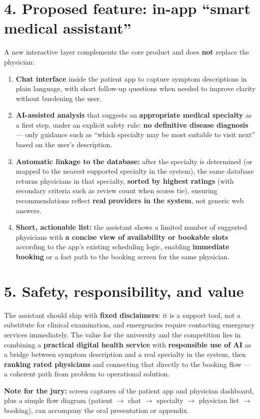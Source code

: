 \documentclass[12pt,a4paper]{article}
\begin{document}
\section*{4. Proposed feature: in-app ``smart medical assistant''}
A new interactive layer complements the core product and does \textbf{not} replace the physician:

\begin{enumerate}
  \item \textbf{Chat interface} inside the patient app to capture symptom descriptions in plain language, with short follow-up questions when needed to improve clarity without burdening the user.
  \item \textbf{AI-assisted analysis} that suggests an \textbf{appropriate medical specialty} as a first step, under an explicit safety rule: \textbf{no definitive disease diagnosis} --- only guidance such as ``which specialty may be most suitable to visit next'' based on the user's description.
  \item \textbf{Automatic linkage to the database:} after the specialty is determined (or mapped to the nearest supported specialty in the system), the same database returns physicians in that specialty, \textbf{sorted by highest ratings} (with secondary criteria such as review count when scores tie), ensuring recommendations reflect \textbf{real providers in the system}, not generic web answers.
  \item \textbf{Short, actionable list:} the assistant shows a limited number of suggested physicians with \textbf{a concise view of availability or bookable slots} according to the app's existing scheduling logic, enabling \textbf{immediate booking} or a fast path to the booking screen for the same physician.
\end{enumerate}

\section*{5. Safety, responsibility, and value}
The assistant should ship with \textbf{fixed disclaimers}: it is a support tool, not a substitute for clinical examination, and emergencies require contacting emergency services immediately. The value for the university and the competition lies in combining a \textbf{practical digital health service} with \textbf{responsible use of AI} as a bridge between symptom description and a real specialty in the system, then \textbf{ranking rated physicians} and connecting that directly to the booking flow --- a coherent path from problem to operational solution.

\vfill
\begin{center}\small
\textbf{Note for the jury:} screen captures of the patient app and physician dashboard, plus a simple flow diagram (patient $\rightarrow$ chat $\rightarrow$ specialty $\rightarrow$ physician list $\rightarrow$ booking), can accompany the oral presentation or appendix.
\end{center}
\end{document}
